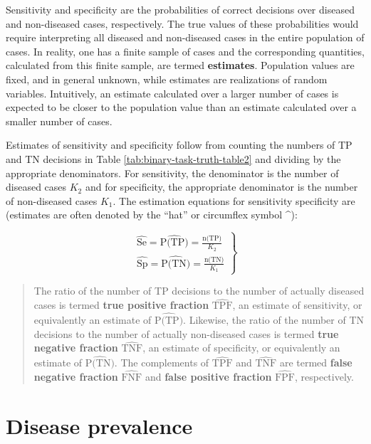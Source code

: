 \documentclass[
]{book}
\begin{document}
Sensitivity and specificity are the probabilities of correct decisions over diseased and non-diseased cases, respectively. The true values of these probabilities would require interpreting all diseased and non-diseased cases in the entire population of cases. In reality, one has a finite sample of cases and the corresponding quantities, calculated from this finite sample, are termed \textbf{estimates}. Population values are fixed, and in general unknown, while estimates are realizations of random variables. Intuitively, an estimate calculated over a larger number of cases is expected to be closer to the population value than an estimate calculated over a smaller number of cases.

Estimates of sensitivity and specificity follow from counting the numbers of TP and TN decisions in Table \ref{tab:binary-task-truth-table2} and dividing by the appropriate denominators. For sensitivity, the denominator is the number of diseased cases \(K_2\) and for specificity, the appropriate denominator is the number of non-diseased cases \(K_1\). The estimation equations for sensitivity specificity are (estimates are often denoted by the ``hat'' or circumflex symbol \^{}):

\begin{equation} 
\left.
\begin{aligned}  
\widehat{\text{Se}}=\widehat{\text{P(TP)}}=\frac{\text{n(TP)}}{K_2}\\
\widehat{\text{Sp}}=\widehat{\text{P(TN)}}=\frac{\text{n(TN)}}{K_1}
\end{aligned}
\right \}
\label{eq:binary-task-se-sp-est}
\end{equation}

\begin{quote}
The ratio of the number of TP decisions to the number of actually diseased cases is termed \textbf{true positive fraction} \(\widehat{\text{TPF}}\), an estimate of sensitivity, or equivalently an estimate of \(\widehat{\text{P(TP)}}\). Likewise, the ratio of the number of TN decisions to the number of actually non-diseased cases is termed \textbf{true negative fraction} \(\widehat{\text{TNF}}\), an estimate of specificity, or equivalently an estimate of \(\widehat{\text{P(TN)}}\). The complements of \(\widehat{\text{TPF}}\) and \(\widehat{\text{TNF}}\) are termed \textbf{false negative fraction} \(\widehat{\text{FNF}}\) and \textbf{false positive fraction} \(\widehat{\text{FPF}}\), respectively.
\end{quote}

\hypertarget{disease-prevalence}{%
\section{Disease prevalence}\label{disease-prevalence}}
\end{document}
